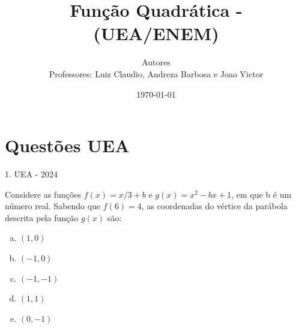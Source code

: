 \documentclass[11pt]{beamer}
\author[CETi / IFAM CMC]{Autores \\ Professores: Luiz Claudio, Andreza Barbosa e Joao Victor}
\title{Função Quadrática - (UEA/ENEM)}
\institute[]{CETi BILÍNGUE GILBERTO MESTRINHO \par INSTITUTO FEDERAL DO AMAZONAS }
\date{\today}
\begin{document}
\justifying
\onehalfspacing 

\begin{frame}
    \titlepage
\end{frame}

\section{Questões UEA}

\begin{frame}{1. UEA - 2024}

    Considere as funções $f(x)={x}/{3}+b$ e $g(x)=x^{2}-bx+1$, em que b é um número real. Sabendo que $f(6)=4$, as coordenadas do vértice da parábola descrita pela função $g(x)$ são:

    \begin{enumerate}[a)]
            \item $(1,0)$ %
            \item $(-1,0)$
            \item $(-1,-1)$
            \item $(1,1)$ 
            \item $(0,-1)$

        \end{enumerate}

\end{frame}
\end{document}

